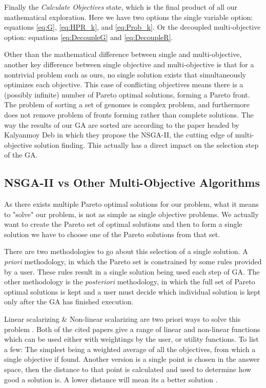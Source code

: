 \documentclass[11pt]{article}
\begin{document}
    Finally the \textit{Calculate Objectives} state, which is the final product of all our
    mathematical exploration. Here we have two options the single variable option: equations
    \ref{eq:G}, \ref{eq:HPR_k}, and \ref{eq:Prob_k}. Or the decoupled multi-objective
    option: equations \ref{eq:DecoupleG} and \ref{eq:DecoupleR}. 

    Other than the mathematical difference between single and multi-objective,
    another key difference between single objective and multi-objective is that for a
    nontrivial problem such as ours, no single solution exists that simultaneously
    optimizes each objective. This case of conflicting objectives means there is
    a (possibly infinite) number of Pareto optimal solutions, forming a Pareto front.
    The problem of sorting a set of genomes is complex problem, and furthermore
    does not remove problem of fronts forming rather than complete solutions.
    The way the results of our GA are sorted are according to the paper headed by
    Kalyanmoy Deb \cite{DebPratapAgarwalMeyarivan} in which they propose the
    NSGA-II, the cutting edge of multi-objective solution finding. This actually
    has a direct impact on the selection step of the GA.

\subsection{NSGA-II vs Other Multi-Objective Algorithms}

    As there exists multiple Pareto optimal solutions for our problem, what it means to "solve"
    our problem, is not as simple as single objective problems. We actually want to create the
    Pareto set of optimal solutions and then to form a single solution we have to choose one of
    the Pareto solutions from that set.

    There are two methodologies to go about this selection of a single solution. A \textit{priori}
    methodology, in which the Pareto set is constrained by some rules provided by a user.
    These rules result in a single solution being used each step of GA. The other
    methodology is the \textit{posteriori} methodology, in which
    the full set of Pareto optimal solutions is kept and a user must decide which individual
    solution is kept only after the GA has finished execution.

    Linear scalarizing \& Non-linear scalarizing are two priori ways to solve this problem
    \cite{KaisaMarko, Moffaert}. Both of the cited papers give a range of linear and non-linear
    functions which can be used either with weightings by the user, or utility functions.
    To list a few: The simplest being a weighted average of all the objectives, from
    which a single objective if found. Another version is a single point is chosen
    in the answer space, then the distance to that point is calculated and used to
    determine how good a solution is. A lower distance will mean its a better solution
    \cite{Buchanan}.
\end{document}
